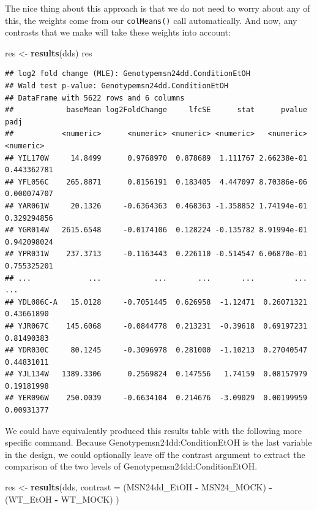 \documentclass[
]{book}
\newenvironment{Shaded}{\begin{snugshade}}{\end{snugshade}}
\newcommand{\AttributeTok}[1]{\textcolor[rgb]{0.13,0.29,0.53}{#1}}
\newcommand{\FunctionTok}[1]{\textcolor[rgb]{0.13,0.29,0.53}{\textbf{#1}}}
\newcommand{\NormalTok}[1]{#1}
\newcommand{\OtherTok}[1]{\textcolor[rgb]{0.56,0.35,0.01}{#1}}
\newcommand{\SpecialCharTok}[1]{\textcolor[rgb]{0.81,0.36,0.00}{\textbf{#1}}}
\begin{document}
The nice thing about this approach is that we do not need to worry about any of this, the weights come from our \texttt{colMeans()} call automatically. And now, any contrasts that we make will take these weights into account:

\begin{Shaded}
\begin{Highlighting}[]
\NormalTok{res }\OtherTok{\textless{}{-}} \FunctionTok{results}\NormalTok{(dds)}
\NormalTok{res}
\end{Highlighting}
\end{Shaded}

\begin{verbatim}
## log2 fold change (MLE): Genotypemsn24dd.ConditionEtOH 
## Wald test p-value: Genotypemsn24dd.ConditionEtOH 
## DataFrame with 5622 rows and 6 columns
##            baseMean log2FoldChange     lfcSE      stat      pvalue        padj
##           <numeric>      <numeric> <numeric> <numeric>   <numeric>   <numeric>
## YIL170W     14.8499      0.9768970  0.878689  1.111767 2.66238e-01 0.443362781
## YFL056C    265.8871      0.8156191  0.183405  4.447097 8.70386e-06 0.000074707
## YAR061W     20.1326     -0.6364363  0.468363 -1.358852 1.74194e-01 0.329294856
## YGR014W   2615.6548     -0.0174106  0.128224 -0.135782 8.91994e-01 0.942098024
## YPR031W    237.3713     -0.1163443  0.226110 -0.514547 6.06870e-01 0.755325201
## ...             ...            ...       ...       ...         ...         ...
## YDL086C-A   15.0128     -0.7051445  0.626958  -1.12471  0.26071321  0.43661890
## YJR067C    145.6068     -0.0844778  0.213231  -0.39618  0.69197231  0.81490383
## YDR030C     80.1245     -0.3096978  0.281000  -1.10213  0.27040547  0.44831011
## YJL134W   1389.3306      0.2569824  0.147556   1.74159  0.08157979  0.19181998
## YER096W    250.0039     -0.6634104  0.214676  -3.09029  0.00199959  0.00931377
\end{verbatim}

We could have equivalently produced this results table with the following more specific command. Because Genotypemsn24dd:ConditionEtOH is the last variable in the design, we could optionally leave off the contrast argument to extract the comparison of the two levels of Genotypemsn24dd:ConditionEtOH.

\begin{Shaded}
\begin{Highlighting}[]
\NormalTok{res }\OtherTok{\textless{}{-}} \FunctionTok{results}\NormalTok{(dds, }
               \AttributeTok{contrast =}\NormalTok{ (MSN24dd\_EtOH }\SpecialCharTok{{-}}\NormalTok{ MSN24\_MOCK) }\SpecialCharTok{{-}}\NormalTok{ (WT\_EtOH }\SpecialCharTok{{-}}\NormalTok{ WT\_MOCK)}
\NormalTok{               )}
\end{Highlighting}
\end{Shaded}
\end{document}
